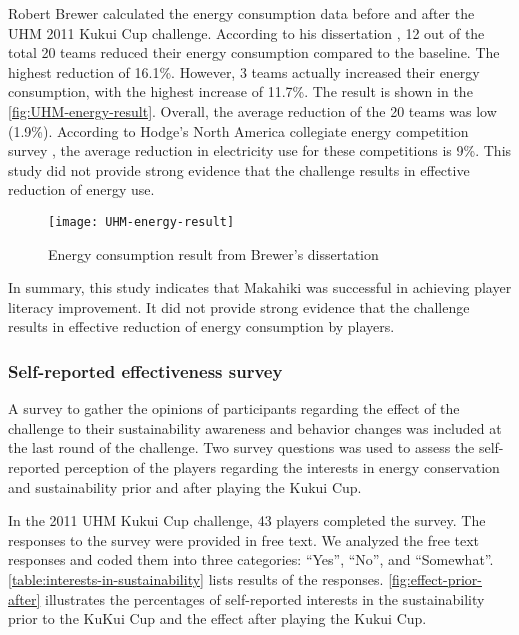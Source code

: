 Robert Brewer calculated the energy consumption data before and after the UHM 2011 Kukui Cup challenge. According to his dissertation \cite{csdl2-10-08}, 12 out of the total 20 teams reduced their energy
consumption compared to the baseline. The highest reduction of 16.1\%. However, 3 teams actually increased
their energy consumption, with the highest increase of 11.7\%. The result is shown in the \autoref{fig:UHM-energy-result}. Overall, the average reduction of the 20 teams was low (1.9\%).  According to Hodge's North America collegiate energy competition survey \cite{Hodge2010}, the average reduction in electricity use for these competitions is 9\%. This study did not provide strong evidence that the challenge results in effective reduction of energy use.

\begin{figure}[ht!]
  \center
  \texttt{[image: UHM-energy-result]}
  \caption{Energy consumption result from Brewer's dissertation \cite{csdl2-10-08}}
  \label{fig:UHM-energy-result}
\end{figure}

In summary, this study indicates that Makahiki was successful in achieving player literacy improvement. It did not provide strong evidence that the challenge results in effective reduction of energy consumption by players. 

\subsubsection{Self-reported effectiveness survey}
\label{sec:player-self-reported-effectiveness-result}

A survey to gather the opinions of participants regarding the effect of the challenge to their sustainability awareness and behavior changes was included at the last round of the challenge. 
Two survey questions was used to assess the self-reported perception of the players regarding the interests in energy conservation and sustainability prior and after playing the Kukui Cup. 

In the 2011 UHM Kukui Cup challenge, 43 players completed the survey. The responses to the survey were provided in free text. We analyzed the free text responses and coded them into three categories: ``Yes'', ``No'', and ``Somewhat''. \autoref{table:interests-in-sustainability} lists results of the responses. \autoref{fig:effect-prior-after} illustrates the percentages of self-reported interests in the sustainability prior to the KuKui Cup and the effect after playing the Kukui Cup.

